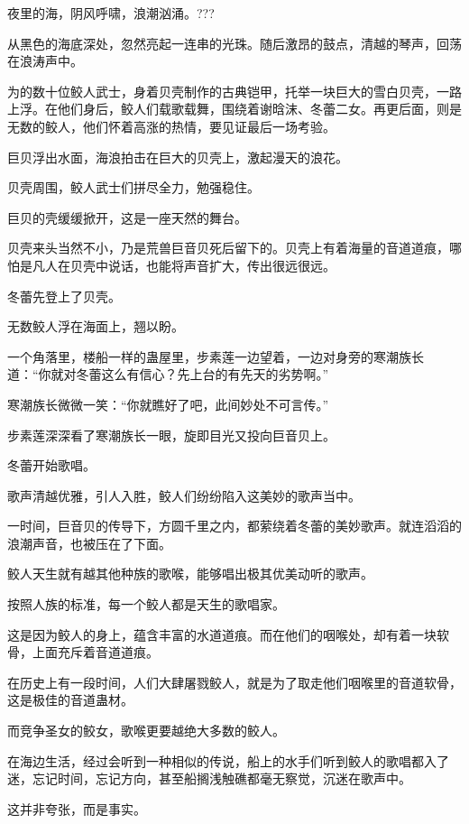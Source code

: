 
\begin{this_body}

夜里的海，阴风呼啸，浪潮汹涌。???

从黑色的海底深处，忽然亮起一连串的光珠。随后激昂的鼓点，清越的琴声，回荡在浪涛声中。

为的数十位鲛人武士，身着贝壳制作的古典铠甲，托举一块巨大的雪白贝壳，一路上浮。在他们身后，鲛人们载歌载舞，围绕着谢晗沫、冬蕾二女。再更后面，则是无数的鲛人，他们怀着高涨的热情，要见证最后一场考验。

巨贝浮出水面，海浪拍击在巨大的贝壳上，激起漫天的浪花。

贝壳周围，鲛人武士们拼尽全力，勉强稳住。

巨贝的壳缓缓掀开，这是一座天然的舞台。

贝壳来头当然不小，乃是荒兽巨音贝死后留下的。贝壳上有着海量的音道道痕，哪怕是凡人在贝壳中说话，也能将声音扩大，传出很远很远。

冬蕾先登上了贝壳。

无数鲛人浮在海面上，翘以盼。

一个角落里，楼船一样的蛊屋里，步素莲一边望着，一边对身旁的寒潮族长道：“你就对冬蕾这么有信心？先上台的有先天的劣势啊。”

寒潮族长微微一笑：“你就瞧好了吧，此间妙处不可言传。”

步素莲深深看了寒潮族长一眼，旋即目光又投向巨音贝上。

冬蕾开始歌唱。

歌声清越优雅，引人入胜，鲛人们纷纷陷入这美妙的歌声当中。

一时间，巨音贝的传导下，方圆千里之内，都萦绕着冬蕾的美妙歌声。就连滔滔的浪潮声音，也被压在了下面。

鲛人天生就有越其他种族的歌喉，能够唱出极其优美动听的歌声。

按照人族的标准，每一个鲛人都是天生的歌唱家。

这是因为鲛人的身上，蕴含丰富的水道道痕。而在他们的咽喉处，却有着一块软骨，上面充斥着音道道痕。

在历史上有一段时间，人们大肆屠戮鲛人，就是为了取走他们咽喉里的音道软骨，这是极佳的音道蛊材。

而竞争圣女的鲛女，歌喉更要越绝大多数的鲛人。

在海边生活，经过会听到一种相似的传说，船上的水手们听到鲛人的歌唱都入了迷，忘记时间，忘记方向，甚至船搁浅触礁都毫无察觉，沉迷在歌声中。

这并非夸张，而是事实。


\end{this_body}
